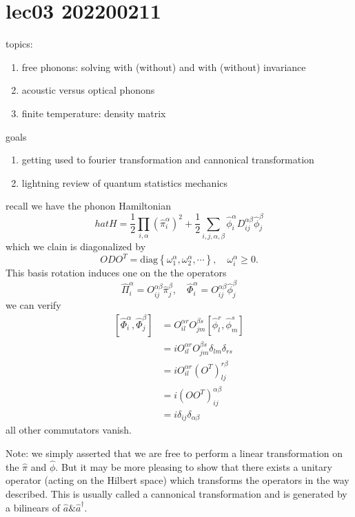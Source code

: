 \chapter{lec03 202200211}

topics:

\begin{enumerate}
    \item free phonons: solving with (without) and with (without) invariance
    \item acoustic versus optical phonons
    \item finite temperature: density matrix
\end{enumerate}

goals

\begin{enumerate}
    \item getting used to fourier transformation and cannonical transformation
    \item lightning review of quantum statistics mechanics
\end{enumerate}

recall we have the phonon Hamiltonian
\[ hat{H}=\frac{1}{2}\prod_{i,\alpha}{\left( \hat{\pi}_{i}^{\alpha} \right) ^2}+\frac{1}{2}\sum_{i,j,\alpha ,\beta}{\hat{\phi}_{i}^{\alpha}D_{ij}^{\alpha \beta}\hat{\phi}_{j}^{\beta}} \]
which we clain is diagonalized by
\[ ODO^T=\mathrm{diag}\left\{ \omega _{1}^{\alpha},\omega _{2}^{\alpha},\cdots \right\} ,\quad \omega _{i}^{\alpha}\ge 0.\]
This basis rotation induces one on the the operators
\[ \hat{\Pi}_{i}^{\alpha}=O_{ij}^{\alpha \beta}\hat{\pi}_{j}^{\beta},\quad \hat{\Phi}_{i}^{\alpha}=O_{ij}^{\alpha \beta}\hat{\phi}_{j}^{\beta}\]
we can verify
\begin{align*}
    \left[ \hat{\Phi}_{i}^{\alpha},\hat{\Phi}_{j}^{\beta} \right] &=O_{il}^{\alpha r}O_{jm}^{\beta s}\left[ \hat{\phi}_{l}^{r},\hat{\phi}_{m}^{s} \right] \\
    &=iO_{il}^{\alpha r}O_{jm}^{\beta s}\delta _{lm}\delta _{rs}\\
    &=iO_{il}^{\alpha r}\left( O^T \right) _{lj}^{r\beta}\\
    &=i\left( OO^T \right) _{ij}^{\alpha \beta}\\
    &=i\delta _{ij}\delta _{\alpha \beta}
\end{align*}
all other commutators vanish.

Note: we simply asserted that we are free to perform a linear transformation on the $\hat{\pi}$ and $\hat{\phi}$. But it may be more pleasing to show that there exists a unitary operator (acting on the Hilbert space) which transforms the operators in the way described. This is usually called a cannonical transformation and is generated by a bilinears of $\hat{a} \& \hat{a}^\dagger$.

